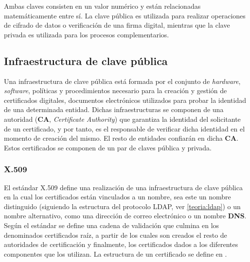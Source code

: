 Ambas claves consisten en un valor numérico y están relacionadas matemáticamente entre sí. La clave pública es utilizada para realizar operaciones de cifrado de datos o verificación de una firma digital, mientras que la clave privada es utilizada para los procesos complementarios.

\subsection{Infraestructura de clave pública}

Una infraestructura de clave pública está formada por el conjunto de \textit{hardware}, \textit{software}, políticas y procedimientos necesario para la creación y gestión de certificados digitales, documentos electrónicos utilizados para probar la identidad de una determinada entidad. Dichas infraestructuras se componen de una autoridad (\textbf{CA}, \textit{Certificate Authority}) que garantiza la identidad del solicitante de un certificado, y por tanto, es el responsable de verificar dicha identidad en el momento de creación del mismo. El resto de entidades confiarán en dicha \textbf{CA}. Estos certificados se componen de un par de claves pública y privada.

\subsubsection{X.509}

El estándar X.509\cite{rfc4158} define una realización de una infraestructura de clave pública en la cual los certificados están vinculados a un nombre, sea este un nombre distinguido (siguiendo la estructura del protocolo LDAP, ver \ref{teoria:ldap}) o un nombre alternativo, como una dirección de correo electrónico o un nombre \textbf{DNS}. Según el estándar se define una cadena de validación que culmina en los denominados certificados raíz, a partir de los cuales son creados el resto de autoridades de certificación y finalmente, los certificados dados a los diferentes componentes que los utilizan. La estructura de un certificado se define en \cite{rfc5280}.

